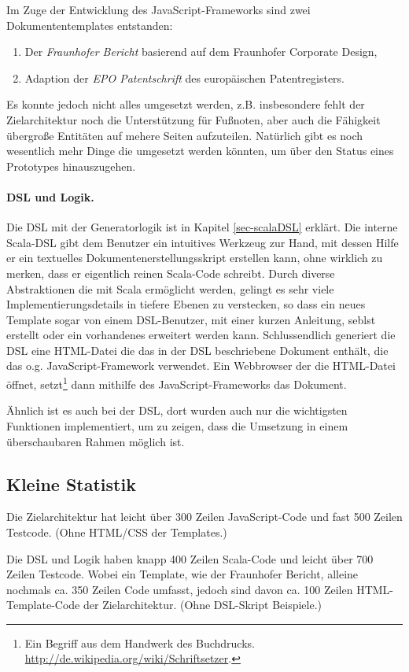 Im Zuge der Entwicklung des JavaScript-Frameworks sind zwei Dokumententemplates
entstanden:

\begin{enumerate}
  \item Der \emph{Fraunhofer Bericht} basierend auf dem
        Fraunhofer Corporate Design,
  \item Adaption der \emph{EPO Patentschrift} des europäischen Patentregisters.
\end{enumerate}

Es konnte jedoch nicht alles umgesetzt werden, z.B. insbesondere fehlt
der Zielarchitektur noch die Unterstützung für Fußnoten, aber auch die
Fähigkeit übergroße Entitäten auf mehere Seiten aufzuteilen. Natürlich gibt
es noch wesentlich mehr Dinge die umgesetzt werden könnten, um über den Status
eines Prototypes hinauszugehen.

\paragraph{DSL und Logik.}
Die DSL mit der Generatorlogik ist in Kapitel \ref{sec-scalaDSL} erklärt.
Die interne Scala-DSL gibt dem Benutzer ein intuitives Werkzeug zur Hand,
mit dessen Hilfe er ein textuelles Dokumentenerstellungsskript erstellen kann,
ohne wirklich zu merken, dass er eigentlich reinen Scala-Code schreibt.
Durch diverse Abstraktionen die mit Scala ermöglicht werden, gelingt es
sehr viele Implementierungsdetails in tiefere Ebenen zu verstecken, so
dass ein neues Template sogar von einem DSL-Benutzer, mit einer kurzen
Anleitung, seblst erstellt oder ein vorhandenes erweitert werden kann.
Schlussendlich generiert die DSL eine HTML-Datei die das in der DSL
beschriebene Dokument enthält, die das o.g. JavaScript-Framework verwendet.
Ein Webbrowser der die HTML-Datei öffnet, setzt\footnote{
Ein Begriff aus dem Handwerk des Buchdrucks.
\url{http://de.wikipedia.org/wiki/Schriftsetzer}.}
dann mithilfe des JavaScript-Frameworks das Dokument.

Ähnlich ist es auch bei der DSL, dort wurden auch nur die wichtigsten Funktionen
implementiert, um zu zeigen, dass die Umsetzung in einem überschaubaren
Rahmen möglich ist.

\subsection{Kleine Statistik}

Die Zielarchitektur hat leicht über 300 Zeilen JavaScript-Code und
fast 500 Zeilen Testcode. (Ohne HTML/CSS der Templates.)

Die DSL und Logik haben knapp 400 Zeilen Scala-Code und leicht über 700 Zeilen
Testcode. Wobei ein Template, wie der Fraunhofer Bericht, alleine nochmals
ca. 350 Zeilen Code umfasst, jedoch sind davon ca. 100 Zeilen HTML-Template-Code
der Zielarchitektur. (Ohne DSL-Skript Beispiele.)
